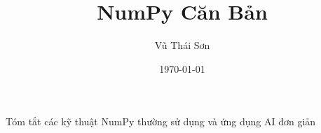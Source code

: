 \documentclass[12pt]{article}
\begin{document}
\title{NumPy Căn Bản}
\author{Vũ Thái Sơn}
\date{\today}
\maketitle

\begin{center}
\large Tóm tắt các kỹ thuật NumPy thường sử dụng và ứng dụng AI đơn giản
\end{center}





\end{document}
